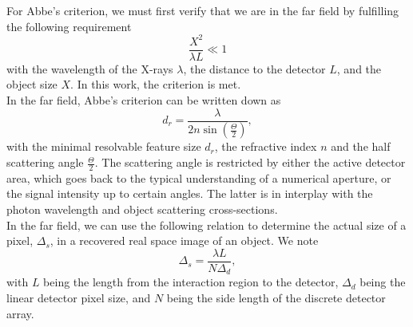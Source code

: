 %
For Abbe's criterion, we must first verify that we are in the far field by fulfilling the following requirement \cite{Williams-2010-NJP}
\begin{equation}
\frac{X^{2}}{\lambda L} \ll 1
\label{eq:far-field-test}
\end{equation}
with the wavelength of the X-rays $\lambda$, the distance to the detector $L$, and the object size $X$. In this work, the criterion is met.\\[1\baselineskip]
%
In the far field, Abbe's criterion can be written down as
\begin{equation}
    d_r = \frac{\lambda}{2n \sin(\frac{\Theta}{2})},
		\label{eq:abbe-criterion}
\end{equation}
with the minimal resolvable feature size $d_r$, the refractive index $n$ and the half scattering angle $\frac{\Theta}{2}$. The scattering angle is restricted by either the active detector area, which goes back to the typical understanding of a numerical aperture, or the signal intensity up to certain angles. The latter is in interplay with the photon wavelength and object scattering cross-sections.\\[1\baselineskip]
In the far field, we can use the following relation to determine the actual size of a pixel, $\Delta_{s}$, in a recovered real space image of an object. We note \cite{Williams-2010-NJP}
\begin{equation}
    \Delta_{s} = \frac{\lambda L}{N \Delta_{d}},
\label{eq:relation-pixel-fourier}
\end{equation}
with $L$ being the length from the interaction region to the detector, $\Delta_{d}$ being the linear detector pixel size, and $N$ being the side length of the discrete detector array.\\[1\baselineskip]
%

